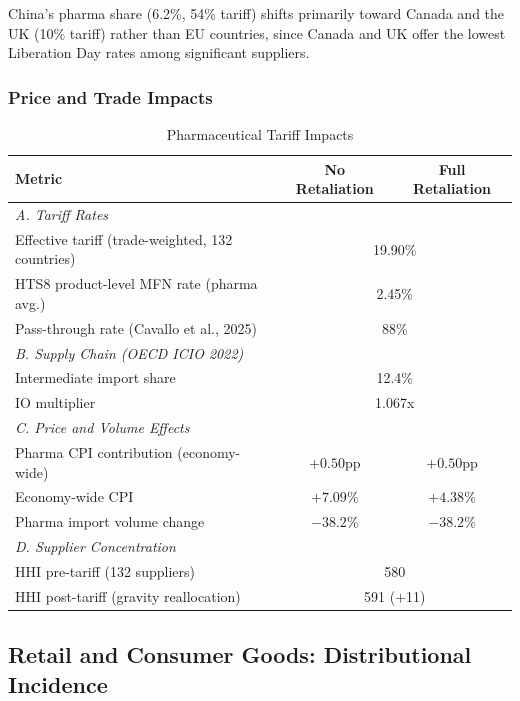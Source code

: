 \documentclass[12pt]{article}
\begin{document}
China's pharma share (6.2\%, 54\% tariff) shifts primarily toward
Canada and the UK (10\% tariff) rather than EU countries, since Canada
and UK offer the lowest Liberation Day rates among significant suppliers.

\subsubsection{Price and Trade Impacts}

\begin{table}[H]
\centering
\caption{Pharmaceutical Tariff Impacts}
\label{tab:pharma_price}
\begin{tabular}{lcc}
\toprule
Metric & No Retaliation & Full Retaliation \\
\midrule
\multicolumn{3}{l}{\textit{A. Tariff Rates}} \\
Effective tariff (trade-weighted, 132 countries) & \multicolumn{2}{c}{19.90\%} \\
HTS8 product-level MFN rate (pharma avg.) & \multicolumn{2}{c}{2.45\%} \\
Pass-through rate (Cavallo et al., 2025) & \multicolumn{2}{c}{88\%} \\
\midrule
\multicolumn{3}{l}{\textit{B. Supply Chain (OECD ICIO 2022)}} \\
Intermediate import share & \multicolumn{2}{c}{12.4\%} \\
IO multiplier & \multicolumn{2}{c}{1.067x} \\
\midrule
\multicolumn{3}{l}{\textit{C. Price and Volume Effects}} \\
Pharma CPI contribution (economy-wide) & $+0.50$pp & $+0.50$pp \\
Economy-wide CPI & $+7.09\%$ & $+4.38\%$ \\
Pharma import volume change & $-38.2\%$ & $-38.2\%$ \\
\midrule
\multicolumn{3}{l}{\textit{D. Supplier Concentration}} \\
HHI pre-tariff (132 suppliers) & \multicolumn{2}{c}{580} \\
HHI post-tariff (gravity reallocation) & \multicolumn{2}{c}{591 ($+$11)} \\
\bottomrule
\end{tabular}
\end{table}

\subsection{Retail and Consumer Goods: Distributional Incidence}
\end{document}
